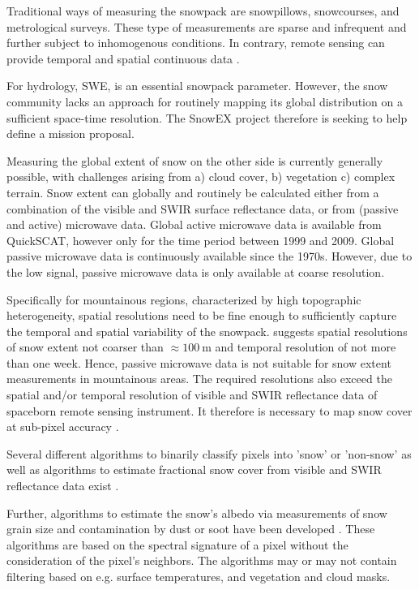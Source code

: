\documentclass[letterpaper, parskip=half]{scrartcl}
\begin{document}
Traditional ways of measuring the snowpack are snowpillows, snowcourses, and metrological surveys. These type of measurements are sparse and infrequent and further subject to inhomogenous conditions. In contrary, remote sensing can provide temporal and spatial continuous data \citep{Dozier2004, Nolin2010}.

For hydrology, \gls{SWE}, is an essential snowpack parameter. However, the snow community lacks an approach for routinely mapping its global distribution \citep{Lettenmaier2015} on a sufficient space-time resolution. The SnowEX \citep{Durand2017} project therefore is seeking to help define a mission proposal. 

Measuring the global extent of snow on the other side is currently generally possible, with challenges arising from a) cloud cover, b) vegetation c) complex terrain. Snow extent can globally and routinely be calculated either from a combination of the visible and \gls{SWIR} surface reflectance data, or from (passive and active) microwave \citep{Frei2012} data. Global active microwave data is available from \gls{QuickSCAT}, however only for the time period between 1999 and 2009. Global passive microwave data is continuously available since the 1970s. However, due to the low signal, passive microwave data is only available at coarse resolution.

Specifically for mountainous regions, characterized by high topographic heterogeneity, spatial resolutions need to be fine enough to sufficiently capture the temporal and spatial variability of the snowpack. \cite{Lettenmaier2015} suggests spatial resolutions of snow extent not coarser than $\approx \SI{100}{\meter}$ and temporal resolution of not more than one week. Hence, passive microwave data is not suitable for snow extent measurements in mountainous areas. The required resolutions also exceed the spatial and/or temporal resolution of visible and \gls{SWIR} reflectance data of spaceborn remote sensing instrument. It therefore is necessary to map snow cover at sub-pixel accuracy \citep{Dozier2004}.

Several different algorithms to binarily classify pixels into 'snow' or 'non-snow' as well as algorithms to estimate fractional snow cover from visible and \gls{SWIR} reflectance data exist \citep{Nolin2010}.

Further, algorithms to estimate the snow's albedo via measurements of snow grain size and contamination by dust or soot have been developed \citep{Nolin2010, Dozier2004}. These algorithms are based on the spectral signature of a pixel without the consideration of the pixel's neighbors. The algorithms may or may not contain filtering based on e.g. surface temperatures, and vegetation and cloud masks.
\end{document}
